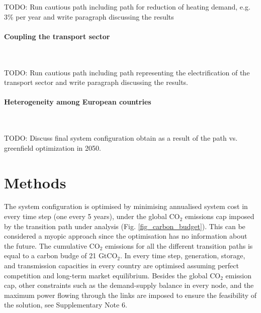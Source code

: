 \documentclass[5p]{elsarticle} %
\begin{document}
\textcolor[rgb]{1,0,0}{TODO: Run cautious path including path for reduction of heating demand, e.g. 3\% per year and write paragraph discussing the results}

\paragraph{\textbf{Coupling the transport sector}} \

\textcolor[rgb]{1,0,0}{TODO: Run cautious path including path representing the electrification of the transport sector and write paragraph discussing the results.}

\paragraph{\textbf{Heterogeneity among European countries}} \

\textcolor[rgb]{1,0,0}{TODO: Discuss final system configuration obtain as a result of the path vs. greenfield optimization in 2050.}

\section{Methods}

The system configuration is optimised by minimising annualised system cost in every time step (one every 5 years), under the global CO$_2$ emissions cap imposed by the transition path under analysis (Fig. \ref{fig_carbon_budget}). This can be considered a myopic approach since the optimisation has no information about the future. The cumulative CO$_2$ emissions for all the different transition paths is equal to a carbon budge of 21 GtCO$_2$. In every time step, generation, storage, and transmission capacities in every country are optimised assuming perfect competition and long-term market equilibrium. Besides the global CO$_2$ emission cap, other constraints such as the demand-supply balance in every node, and the maximum power flowing through the links are imposed to ensure the feasibility of the solution, see Supplementary Note 6. \
\end{document}
